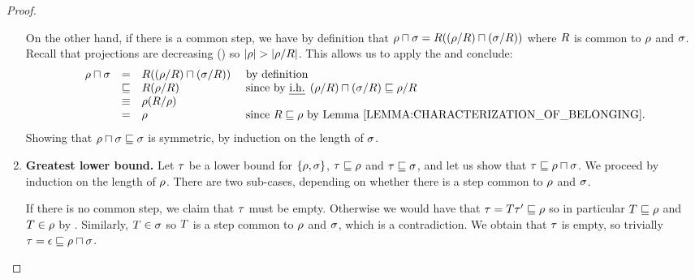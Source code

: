 \begin{proof}
\begin{enumerate}
  On the other hand, if there is a common step, we have by definition that
  $\rho \sqcap \sigma = R((\rho/R) \sqcap (\sigma/R))$
  where $R$ is common to $\rho$ and $\sigma$.
  Recall that projections are decreasing ()
  so $|\rho| > |\rho/R|$.
  This allows us to apply the \ih and conclude:
  \[
  \begin{array}{rcll}
    \redseq \sqcap \redseqtwo & =       & \redex((\redseq/\redex) \sqcap (\redseqtwo/\redex)) & \text{ by definition} \\
                              & \permle & \redex(\redseq/\redex)   & \text{ since by \ih $(\redseq/\redex) \sqcap (\redseqtwo/\redex) \permle \redseq/\redex$} \\
                              & \permeq & \redseq(\redex/\redseq)  \\
                              & =       & \redseq                  & \text{ since $\redex \permle \redseq$ by \rlem{characterization_of_belonging}.} \\
  \end{array}
  \]
  Showing that $\rho \sqcap \sigma \sqsubseteq \sigma$ is symmetric,
  by induction on the length of $\sigma$.
\item {\bf Greatest lower bound.}
  Let $\tau$ be a lower bound for $\{\rho, \sigma\}$,
  \ie $\tau \sqsubseteq \rho$ and $\tau \sqsubseteq \sigma$,
  and let us show that $\tau \sqsubseteq \rho \sqcap \sigma$.
  We proceed by induction on the length of $\rho$.
  There are two sub-cases, depending on whether
  there is a step common to $\rho$ and $\sigma$.

  If there is no common step,
  we claim that $\tau$ must be empty.
  Otherwise we would have that $\tau = T\tau' \sqsubseteq \rho$
  so in particular $T \sqsubseteq \rho$ and $T \in \rho$ by .
  Similarly, $T \in \sigma$ so
  $T$ is a step common to $\rho$ and $\sigma$,
  which is a contradiction.
  We obtain that $\tau$ is empty,
  so trivially $\tau = \epsilon \sqsubseteq \rho \sqcap \sigma$.


\end{enumerate}
\end{proof}
